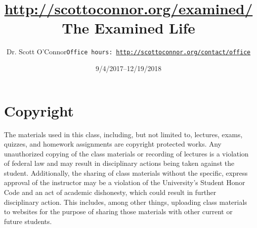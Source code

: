 \documentclass[article,oneside]{memoir}
\def\myauthor{Author}
\def\mytitle{Title}
\def\mycopyright{\myauthor}
\def\myweb{\href{http://scottoconnor.org/examined/}{http://scottoconnor.org/examined/}}
\def\myauthor{Dr. Scott O'Connor}
\def\mytitle{{\normalsize \myweb \newline} \HUGE The Examined Life}
\begin{document}
\setsansfont[Mapping=tex-text]{Myriad Pro} 
\setmonofont[Mapping=tex-text,Scale=0.8]{Georgia} 

\def\ind{\hangindent=1 true cm\hangafter=1 \noindent}
\def\labelitemi{$\cdot$}


\title{\LARGE \mytitle}     
\author{\Large\myauthor \newline \footnotesize\texttt{\noindent Office hours: \href{http://scottoconnor.org/contact/office}{http://scottoconnor.org/contact/office}}}
\date{9/4/2017--12/19/2018}


\maketitle




%
%

\section{Copyright}
The materials used in this class, including, but not limited to, lectures, exams, quizzes, and homework assignments are copyright protected works.  Any unauthorized copying of the class materials or recording of lectures is a violation of federal law and may result in disciplinary actions being taken against the student.  Additionally, the sharing of class materials without the specific, express approval of the instructor may be a violation of the University's Student Honor Code and an act of academic dishonesty, which could result in further disciplinary action.  This includes, among other things, uploading class materials to websites for the purpose of sharing those materials with other current or future students. 
\end{document}
